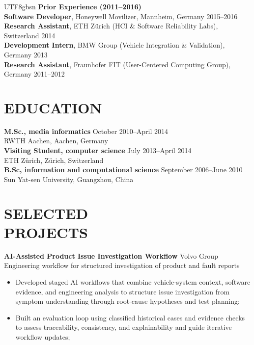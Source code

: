 \documentclass[margin, 10pt]{res} %
\begin{document}
\begin{resume}
\begin{CJK}{UTF8}{gbsn}
\textbf{Prior Experience (2011–2016)} \\
\textbf{Software Developer}, Honeywell Movilizer, Mannheim, Germany \hfill 2015–2016 \\
\textbf{Research Assistant}, ETH Zürich (HCI \& Software Reliability Labs), Switzerland \hfill 2014 \\
\textbf{Development Intern}, BMW Group (Vehicle Integration \& Validation), Germany \hfill 2013 \\
\textbf{Research Assistant}, Fraunhofer FIT (User-Centered Computing Group), Germany \hfill 2011–2012


\section{EDUCATION}
\textbf{M.Sc., media informatics} \hfill October 2010–April 2014 \\
RWTH Aachen, Aachen, Germany \\
\textbf{Visiting Student, computer science} \hfill July 2013–April 2014\\
ETH Zürich, Zürich, Switzerland   \\
\textbf{B.Sc, information and computational science} \hfill September 2006–June 2010\\
Sun Yat-sen University, Guangzhou, China


\section{SELECTED \\ PROJECTS}

\textbf{AI-Assisted Product Issue Investigation Workflow} \hfill Volvo Group \\
Engineering workflow for structured investigation of product and fault reports
\begin{itemize} \itemsep -2pt %
\item Developed staged AI workflows that combine vehicle-system context, software evidence, and engineering analysis to structure issue investigation from symptom understanding through root-cause hypotheses and test planning;
\item Built an evaluation loop using classified historical cases and evidence checks to assess traceability, consistency, and explainability and guide iterative workflow updates;
\end{itemize}


\end{CJK}
\end{resume}
\end{document}
